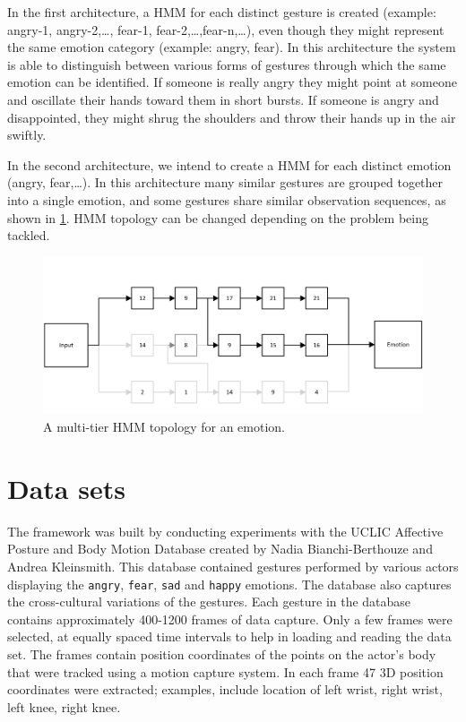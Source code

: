 \documentclass[]{report}   %
\begin{document}
In the first architecture, a HMM for each distinct gesture is created (example: angry-1, angry-2,\ldots, fear-1, fear-2,\ldots,fear-n,\ldots), even though they might represent the same emotion category (example: angry, fear). In this architecture the system is able to distinguish between various forms of gestures through which the same emotion can be identified. If someone is really angry they might point at someone and oscillate their hands toward them in short bursts. If someone is angry and disappointed, they might shrug the shoulders and throw their hands up in the air swiftly. 

In the second architecture, we intend to create a HMM for each distinct emotion (angry, fear,\ldots). In this architecture many similar gestures are grouped together into a single emotion, and some gestures share similar observation sequences, as shown in \ref{fig:multitopology}. HMM topology can be changed depending on the problem being tackled. 

\begin{figure}[htbp]
	\centering
		\includegraphics[width=1.0\textwidth]{multitopology.pdf}
	\caption{A multi-tier HMM topology for an emotion.}
	\label{fig:multitopology}
\end{figure}

\section{Data sets} The framework was built by conducting experiments with the UCLIC Affective Posture and Body Motion Database created by Nadia Bianchi-Berthouze and Andrea Kleinsmith\cite{Kleinsmith:2006:CDR:1221613.1222203}. This database contained gestures performed by various actors displaying the \texttt{angry}, \texttt{fear}, \texttt{sad} and \texttt{happy} emotions. The database also captures the cross-cultural variations of the gestures. Each gesture in the database contains approximately 400-1200 frames of data capture. Only a few frames were selected, at equally spaced time intervals to help in loading and reading the data set. The frames contain position coordinates of the points on the actor's body that were tracked using a motion capture system. In each frame 47 3D position coordinates were extracted; examples, include location of left wrist, right wrist, left knee, right knee. 
\end{document}
